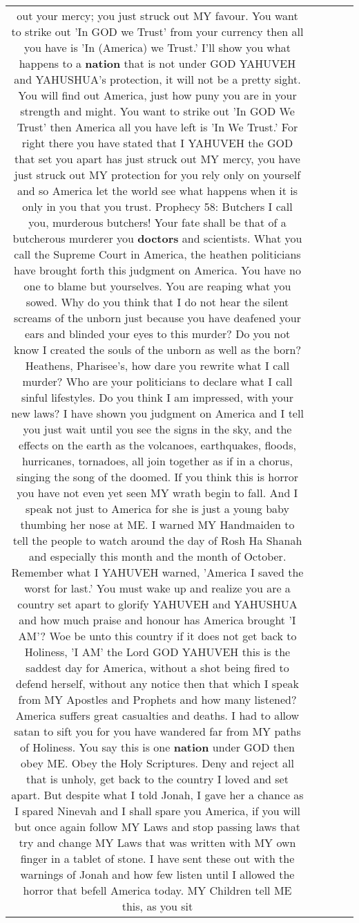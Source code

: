 \documentclass[11pt]{article}
\newlength\mylength
\begin{document}
\begin{center}
\begin{longtable}{|C{.65\mylength}|C{.30\mylength}|C{.12\mylength}|C{.12\mylength}|C{.12\mylength}|}
out your mercy; you just struck out MY favour. You want to strike out 'In GOD we Trust' from your currency then all you have is 'In (America) we Trust.' I'll show you what happens to a \textbf{nation} that is not under GOD YAHUVEH and YAHUSHUA's protection, it will not be a pretty sight. You will find out America, just how puny you are in your strength and might. You want to strike out 'In GOD We Trust' then America all you have left is 'In We Trust.' For right there you have stated that I YAHUVEH the GOD that set you apart has just struck out MY mercy, you have just struck out MY protection for you rely only on yourself and so America let the world see what happens when it is only in you that you trust.                 Prophecy 58: Butchers I call you, murderous butchers! Your fate shall be that of a butcherous murderer you \textbf{doctors} and scientists.  What you call the Supreme Court in America, the heathen politicians have brought forth this judgment on America. You have no one to blame but yourselves. You are reaping what you sowed. Why do you think that I do not hear the silent screams of the unborn just because you have deafened your ears and blinded your eyes to this murder? Do you not know I created the souls of the unborn as well as the born? Heathens, Pharisee's, how dare you rewrite what I call murder? Who are your politicians to declare what I call sinful lifestyles. Do you think I am impressed, with your new laws? I have shown you judgment on America and I tell you just wait until you see the signs in the sky, and the effects on the earth as the volcanoes, earthquakes, floods, hurricanes, tornadoes, all join together as if in a chorus, singing the song of the doomed. If you think this is horror you have not even yet seen MY wrath begin to fall. And I speak not just to America for she is just a young baby thumbing her nose at ME. I warned MY Handmaiden to tell the people to watch around the day of Rosh Ha Shanah and especially this month and the month of October. Remember what I YAHUVEH warned, 'America I saved the worst for last.' You must wake up and realize you are a country set apart to glorify YAHUVEH and YAHUSHUA and how much praise and honour has America brought 'I AM'? Woe be unto this country if it does not get back to Holiness, 'I AM' the Lord GOD YAHUVEH this is the saddest day for America, without a shot being fired to defend herself, without any notice then that which I speak from MY Apostles and Prophets and how many listened? America suffers great casualties and deaths. I had to allow satan to sift you for you have wandered far from MY paths of Holiness. You say this is one \textbf{nation} under GOD then obey ME. Obey the Holy Scriptures. Deny and reject all that is unholy, get back to the country I loved and set apart. But despite what I told Jonah, I gave her a chance as I spared Ninevah and I shall spare you America, if you will but once again follow MY Laws and stop passing laws that try and change MY Laws that was written with MY own finger in a tablet of stone. I have sent these out with the warnings of Jonah and how few listen until I allowed the horror that befell America today. MY Children tell ME this, as you sit 
\end{longtable}
\end{center}
\end{document}
